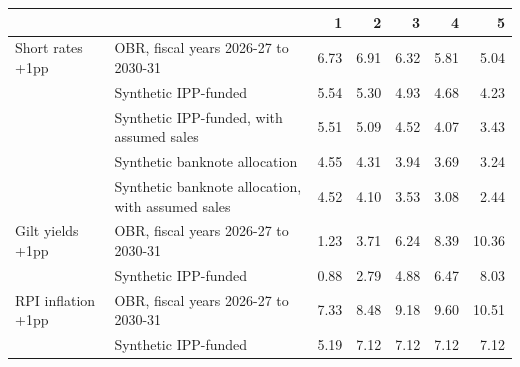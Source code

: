 \begin{tabular}{llrrrrr}
\toprule
 & & 1 & 2 & 3 & 4 & 5 \\
\midrule
Short rates +1pp & OBR, fiscal years 2026-27 to 2030-31 & 6.73 & 6.91 & 6.32 & 5.81 & 5.04 \\
 & Synthetic IPP-funded & 5.54 & 5.30 & 4.93 & 4.68 & 4.23 \\
 & Synthetic IPP-funded, with assumed sales & 5.51 & 5.09 & 4.52 & 4.07 & 3.43 \\
 & Synthetic banknote allocation & 4.55 & 4.31 & 3.94 & 3.69 & 3.24 \\
 & Synthetic banknote allocation, with assumed sales & 4.52 & 4.10 & 3.53 & 3.08 & 2.44 \\
Gilt yields +1pp & OBR, fiscal years 2026-27 to 2030-31 & 1.23 & 3.71 & 6.24 & 8.39 & 10.36 \\
 & Synthetic IPP-funded & 0.88 & 2.79 & 4.88 & 6.47 & 8.03 \\
RPI inflation +1pp & OBR, fiscal years 2026-27 to 2030-31 & 7.33 & 8.48 & 9.18 & 9.60 & 10.51 \\
 & Synthetic IPP-funded & 5.19 & 7.12 & 7.12 & 7.12 & 7.12 \\
\bottomrule
\end{tabular}
